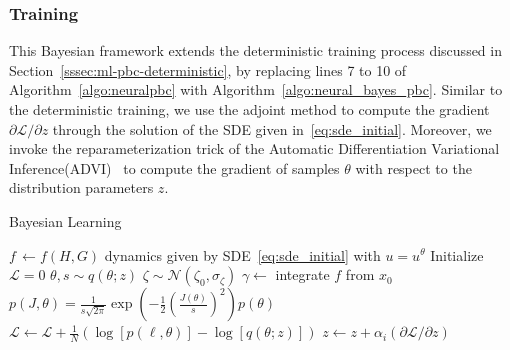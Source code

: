 \subsubsection{Training}
%
This Bayesian framework extends the deterministic training process discussed in
Section~\ref{sssec:ml-pbc-deterministic}, by replacing lines 7 to 10 of
Algorithm~\ref{algo:neuralpbc} with Algorithm~\ref{algo:neural_bayes_pbc}.
%
%
%
Similar to the deterministic training, we use the adjoint method to compute the
gradient ${\partial \mathcal{L}}/{\partial z}$ through the solution of the SDE
given in~\eqref{eq:sde_initial}.
%
Moreover, we invoke the reparameterization trick of the Automatic
Differentiation Variational
Inference(\textsc{ADVI})~\cite{kucukelbir2015automatic} to compute the gradient
of samples $\theta$ with respect to the distribution parameters $z$.
%



\begin{algorithm}
    \caption{Bayesian Learning}\label{algo:neural_bayes_pbc}
    \small
    \begin{algorithmic}[1]
        \State $f \,\gets f(H,G)$ dynamics given by SDE~\eqref{eq:sde_initial} with $u = u^\theta$
        \State Initialize $\mathcal{L} = 0$
            \State $\theta, s \sim q(\theta; z)$ 
            \State $\zeta \sim \mathcal{N}(\zeta_0,\sigma_{\zeta})$ 
            \State $\gamma \gets$ integrate $f$ from $x_0$ 
            \State $p(J, \theta) = \frac{1}{s\sqrt{2\pi}}\exp{\left(-\frac{1}{2} \left ( \frac{J(\theta)}{s}\right)^2 \right)} p(\theta)$
            \State $\mathcal{L} \gets \mathcal{L} + \frac{1}{N}\left (\log[p(\ell, \theta)] - \log[q(\theta;z)]\right)$
        \EndFor
        \EndFor
        \State $z \gets z + \alpha_i \left({\partial \mathcal{L}}/{\partial z}\right)$
    \end{algorithmic}
\end{algorithm}

